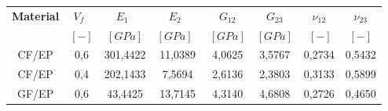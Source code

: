 \begin{table}[htbp]
  \scriptsize
  \centering
  
    \begin{tabularx}{\textwidth}{cccccccc}
    \toprule
  \textbf{Material} & \textbf{$V_{f}$}\ & \textbf{$E_{1}$}\ & \textbf{$E_{2}$}\ & \textbf{$G_{12}$} &  \textbf{$G_{23}$} &\textbf{$\nu_{12}$} & \textbf{$\nu_{23}$} \\
   & \textbf{$\left[-\right]$} &\textbf{$\left[GPa\right]$}& \textbf{$\left[GPa\right]$}\ & \textbf{$\left[GPa\right]$}& \textbf{$\left[GPa\right]$} & \textbf{$\ \left[-\right]$} & \textbf{$\left[-\right]$} \\
    \midrule
    CF/EP & 0,6   & 301,4422 & 11,0389 & 4,0625 & 3,5767 & 0,2734 & 0,5432 \\
    CF/EP & 0,4   & 202,1433 & 7,5694 & 2,6136 & 2,3803 & 0,3133 & 0,5899 \\
    GF/EP & 0,6   & 43,4425 & 13,7145 & 4,3140 & 4,6808 & 0,2726 & 0,4650 \\
    \bottomrule
    \end{tabularx}%
  \label{tab:UDprop}%
\end{table}%
